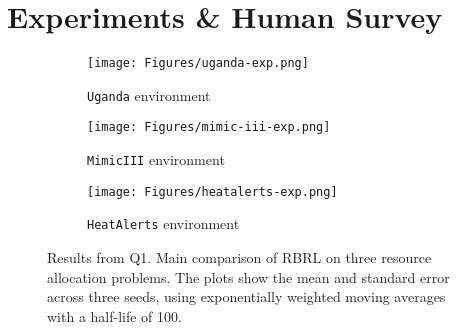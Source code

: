 
\section{Experiments \& Human Survey}\label{sec:exp}

\begin{figure*}[!th]
    \centering
    \begin{subfigure}[b]{0.33\linewidth}
        \centering
        \texttt{[image: Figures/uganda-exp.png]}
        \vskip -4pt
        \caption{\texttt{Uganda} environment}
        \label{fig:uganda-exp}
    \end{subfigure}
    \begin{subfigure}[b]{0.33\linewidth}
        \centering
        \texttt{[image: Figures/mimic-iii-exp.png]}
        \vskip -4pt
        \caption{\texttt{MimicIII} environment}
        \label{fig:mimic-iii-exp}
    \end{subfigure}
    \begin{subfigure}[b]{0.33\linewidth}
        \centering
        \texttt{[image: Figures/heatalerts-exp.png]}
        \vskip -4pt
        \caption{\texttt{HeatAlerts} environment}
        \label{fig:mimic-iii-exp}
    \end{subfigure}
    \vskip -4pt
    \caption{Results from Q1. Main comparison of RBRL on three resource allocation problems. The plots show the mean and standard error across three seeds, using exponentially weighted moving averages with a half-life of 100.}
    \label{fig:results-reward}
\vskip -6pt
\end{figure*}





